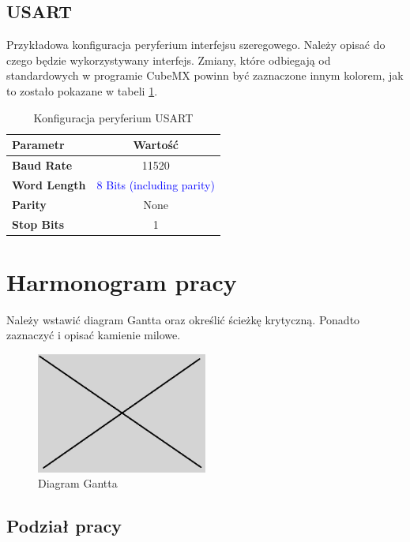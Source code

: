 \documentclass[10pt, a4paper]{article}
\begin{document}
\subsection{USART}

Przykładowa konfiguracja peryferium interfejsu szeregowego.
Należy opisać do czego będzie wykorzystywany interfejs. 
Zmiany, które odbiegają od standardowych w programie CubeMX 
powinn być zaznaczone innym kolorem, jak to zostało pokazane 
w tabeli \ref{tab:USART}.

\begin{table}[H]
	\centering
	\begin{tabular}{|l|c|} \hline
		\textbf{Parametr} & Wartość \\
		\hline
		\hline  \textbf{Baud Rate}&11520  \\\hline
		\textbf{Word Length } & \textcolor{blue}{8 Bits (including parity)}\\\hline
		\textbf{Parity} &  None\\
		\hline
		\textbf{Stop Bits}& 1\\
		\hline
	\end{tabular}
	\caption{Konfiguracja peryferium USART}
	\label{tab:USART}
\end{table}


\section{Harmonogram pracy}

Należy wstawić diagram Gantta oraz określić ścieżkę 
krytyczną. Ponadto zaznaczyć i opisać kamienie milowe.

\begin{figure}[H]
	\centering
	\includegraphics[width=0.5\textwidth]{obraz.png}
	\caption{Diagram Gantta}
	\label{fig:DiagramGantta}
\end{figure}

\subsection{Podział pracy}
\end{document}

